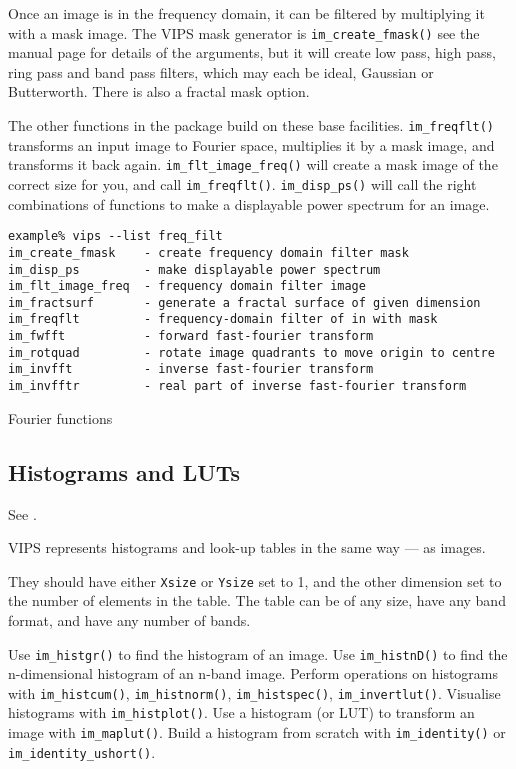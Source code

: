 Once an image is in the frequency domain, it can be filtered by multiplying
it with a mask image. The VIPS mask generator is \verb+im_create_fmask()+
see the manual page for details of the arguments, but it will create low
pass, high pass, ring pass and band pass filters, which may each be ideal,
Gaussian or Butterworth. There is also a fractal mask option.

The other functions in the package build on these base
facilities. \verb+im_freqflt()+ transforms an input image to
Fourier space, multiplies it by a mask image, and transforms it back
again. \verb+im_flt_image_freq()+ will create a mask image of the correct
size for you, and call \verb+im_freqflt()+.  \verb+im_disp_ps()+ will call
the right combinations of functions to make a displayable power spectrum
for an image.

\begin{fig2}
\begin{verbatim}
example% vips --list freq_filt    
im_create_fmask    - create frequency domain filter mask
im_disp_ps         - make displayable power spectrum
im_flt_image_freq  - frequency domain filter image
im_fractsurf       - generate a fractal surface of given dimension
im_freqflt         - frequency-domain filter of in with mask
im_fwfft           - forward fast-fourier transform
im_rotquad         - rotate image quadrants to move origin to centre
im_invfft          - inverse fast-fourier transform
im_invfftr         - real part of inverse fast-fourier transform
\end{verbatim}
\caption{Fourier functions}
\label{fg:freq}
\end{fig2}

\subsection{Histograms and LUTs}

See .

VIPS represents histograms and look-up tables in the same way --- as images.

They should have either \verb+Xsize+ or \verb+Ysize+ set to 1, and the
other dimension set to the number of elements in the table. The table can be
of any size, have any band format, and have any number of bands.

Use \verb+im_histgr()+ to find the histogram of an image.  Use
\verb+im_histnD()+ to find the n-dimensional histogram of an n-band
image.  Perform operations on histograms with \verb+im_histcum()+,
\verb+im_histnorm()+, \verb+im_histspec()+, \verb+im_invertlut()+. Visualise
histograms with \verb+im_histplot()+. Use a histogram (or LUT) to transform
an image with \verb+im_maplut()+. Build a histogram from scratch with
\verb+im_identity()+ or \verb+im_identity_ushort()+.

